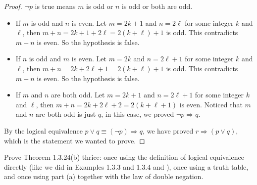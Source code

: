 \begin{solutions*}
\begin{proof}
        $\neg p$ is true means $m$ is odd or $n$ is odd or both are odd.
        \begin{itemize}
            \item If $m$ is odd and $n$ is even. Let $m = 2k+1$ and $n=2\ell$ for some integer $k$ and $\ell$, then $m+n = 2k+1 + 2\ell = 2(k+\ell)+1$ is odd. This contradicts $m+n$ is even. So the hypothesis is false.
            \item If $n$ is odd and $m$ is even. Let $m = 2k$ and $n=2\ell+1$ for some integer $k$ and $\ell$, then $m+n = 2k+2\ell+1 = 2(k+\ell)+1$ is odd. This contradicts $m+n$ is even. So the hypothesis is false.
            \item If $m$ and $n$ are both odd. Let $m = 2k+1$ and $n=2\ell+1$ for some integer $k$ and $\ell$, then $m+n = 2k+2\ell+2=2(k+\ell+1)$ is even. Noticed that $m$ and $n$ are both odd is just $q$, in this case, we proved $\neg p \Rightarrow q$.
        \end{itemize}
        By the logical equivalence $p \vee q \equiv (\neg p) \Rightarrow q$, we have proved $r \Rightarrow (p \vee q)$, which is the statement we wanted to prove.
    \end{proof}
\end{solutions*}

\begin{exercise}
Prove Theorem 1.3.24(b) thrice: once using the definition of logical equivalence directly (like we did in Examples 1.3.3 and 1.3.4 and ), once using a truth table, and once using part (a) together with the law of double negation.
\end{exercise}

